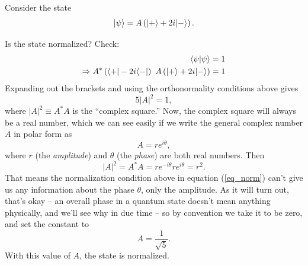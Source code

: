 \begin{example}[Normalization]  Consider the state 
\begin{equation}
| \psi \rangle = A \left( | + \rangle + 2i | - \rangle \right).
\end{equation}

Is the state normalized?  Check:
\begin{align*}
\langle \psi | \psi \rangle &= 1 \\
\Rightarrow A^* \left( \langle + | - 2i \langle - | \right) \ A \left( | + \rangle + 2i| - \rangle \right) &=  1
\end{align*}
Expanding out the brackets and using the orthonormality conditions above gives
\begin{equation}
\label{eq_norm}
5 |A|^2 = 1,
\end{equation}
where $|A|^2 \equiv A^* A$ is the ``complex square.''  Now, the complex square will always be a real number, which we can see easily if we write the general complex number $A$ in polar form as
\[
A = r e^{i\theta},
\]
where $r$ (the \emph{amplitude}) and $\theta$ (the \emph{phase}) are both real numbers.  Then 
\[
|A|^2 = A^* A = re^{-i\theta} r e^{i\theta} = r^2.
\]
That means the normalization condition above in equation (\ref{eq_norm}) can't give us any information about the phase $\theta$, only the amplitude.  As it will turn out, that's okay -- an overall phase in a quantum state doesn't mean anything physically, and we'll see why in due time -- so by convention we take it to be zero, and set the constant to 
\[
A = \frac{1}{\sqrt{5}}.
\]
With this value of $A$, the state is normalized.
\end{example}

